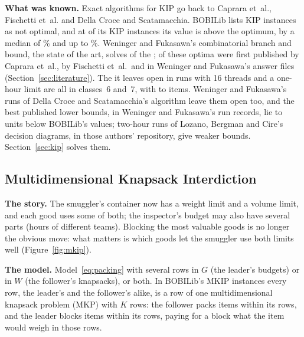 \textbf{What was known.} Exact algorithms for KIP go back to Caprara
et~al.,\cite{caprara2016bilevel} Fischetti et~al.\cite{fischetti2016monotonicity,fischetti2019interdiction}
and Della Croce and Scatamacchia.\cite{dellacroce2020exact} BOBILib
lists \FamKipUnsolved{} KIP instances as not optimal, and at \NumKipBobiAbove{} of its KIP
instances its value is above the optimum, by a median of \KipBobiExcessMedian\% and up to
\KipBobiExcessMax\%. Weninger and Fukasawa's combinatorial branch and
bound,\cite{weninger2023fast,weninger2025fast} the state of the art, solves \NumLitKip{} of the
\FamKipUnsolved{}; \NumLitCaprara{} of these optima were first published by Caprara et~al.,
\NumLitFischettiSixteen{} by Fischetti et~al.\ and \NumLitWeningerFukasawa{} in Weninger and
Fukasawa's answer files (Section~\ref{sec:literature}). The \NumNewKip{} it leaves open in runs with 16 threads and a one-hour
limit\cite{weninger_bkpsolver,weninger2026approx} are all in classes~6 and~7, with \KipOpenItemsMin{} to \KipOpenItemsMax{} items. Weninger and
Fukasawa's runs of Della Croce and Scatamacchia's algorithm leave them open too, and the best
published lower bounds, in Weninger and Fukasawa's run records, lie \KipPubLbGapMin{} to
\KipPubLbGapMax{} units below BOBILib's values;\cite{weninger_bkpsolver} two-hour runs of Lozano,
Bergman and Cire's decision diagrams, in those authors' repository,\cite{lozano_dbo_repo} give
weaker bounds.
Section~\ref{sec:kip} solves them.

\subsection{Multidimensional Knapsack Interdiction}\label{sec:prob-mkip}

\textbf{The story.} The smuggler's container now has a weight limit and a volume limit, and each
good uses some of both; the inspector's budget may also have several parts (hours of different
teams). Blocking the most valuable goods is no longer the obvious move: what matters is which
goods let the smuggler use both limits well (Figure~\ref{fig:mkip}).

\textbf{The model.} Model~\eqref{eq:packing} with several rows in $G$ (the leader's budgets) or
in $W$ (the follower's knapsacks), or both. In BOBILib's MKIP instances every row, the leader's
and the follower's alike, is a row of one multidimensional knapsack problem (MKP) with $K$ rows:
the follower packs items within its rows, and the leader blocks items within its rows, paying for
a block what the item would weigh in those rows.

